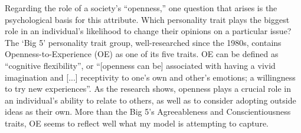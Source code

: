 Regarding the role of a society's ``openness,'' one question that arises is the
psychological basis for this attribute. Which personality trait plays the
biggest role in an individual's likelihood to change their opinions on a
particular issue? The `Big 5' personality trait group\cite{john_big-five_1999},
well-researched since the 1980s, contains Openness-to-Experience (OE) as one of
its five traits. OE can be defined as ``cognitive
flexibility''\cite{deyoung_sources_2005}, or ``[openness can be] associated
with having a vivid imagination and [...] receptivity to one's own and other's
emotions; a willingness to try new experiences''\cite{furnham_childhood_2016}.
As the research shows, openness plays a crucial role in an individual's ability
to relate to others, as well as to consider adopting outside ideas as their
own. More than the Big 5's Agreeableness and Conscientiousness traits, OE seems
to reflect well what my model is attempting to capture.
